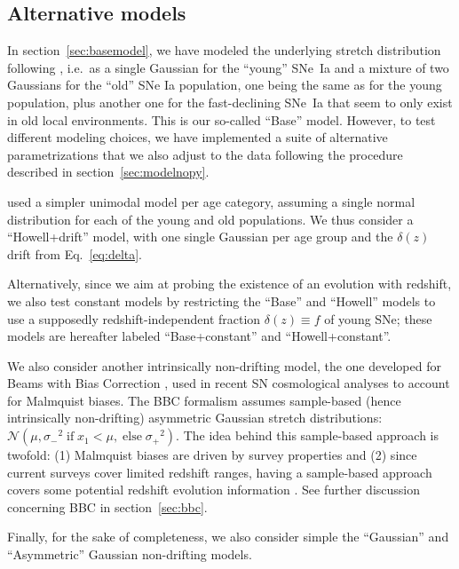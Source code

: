 \documentclass[]{aa} %
\begin{document}
\subsection{Alternative models}\label{sec:othermodel}

In section~\ref{sec:basemodel}, we have modeled the underlying stretch
distribution following \cite{rigault2018}, i.e.\ as a single Gaussian for the
``young'' SNe~Ia and a mixture of two Gaussians for the ``old'' SNe Ia
population, one being the same as for the young population, plus another one for
the fast-declining SNe~Ia that seem to only exist in old local environments.
This is our so-called ``Base'' model. However, to test different modeling
choices, we have implemented a suite of alternative parametrizations that we
also adjust to the data following the procedure described in
section~\ref{sec:modelnopy}. 

\cite{howell2007} used a simpler unimodal model per age category, assuming a
single normal distribution for each of the young and old populations.  We thus
consider a ``Howell+drift'' model, with one single Gaussian per age group and
the $\delta(z)$ drift from Eq.~\ref{eq:delta}.

Alternatively, since we aim at probing the existence of an evolution with
redshift, we also test constant models by restricting the ``Base'' and
``Howell'' models to use a supposedly redshift-independent fraction $\delta(z)
\equiv f$ of young SNe; these models are hereafter labeled ``Base+constant'' and
``Howell+constant''.

We also consider another intrinsically non-drifting model, the one developed for
Beams with Bias Correction \cite[BBC,][]{scolnic2016, kessler2017}, used in
recent SN cosmological analyses \cite[e.g.][]{scolnic2018a, descosmopaper2019,
riess2016, riess2019} to account for Malmquist biases. The BBC formalism assumes
sample-based (hence intrinsically non-drifting) asymmetric Gaussian stretch
distributions: $\mathcal{N}\left(\mu,
\sigma_-{}^2\;\text{if}\;x_1<\mu,\;\text{else}\;\sigma_+{}^2\right)$. The idea
behind this sample-based approach is twofold: (1) Malmquist biases are driven by
survey properties and (2) since current surveys cover limited redshift ranges, having a sample-based approach covers
some potential redshift evolution information \citep{scolnic2016, scolnic2018a}.
See further discussion concerning BBC in section~\ref{sec:bbc}. 

Finally, for the sake of completeness, we also consider simple the ``Gaussian''
and ``Asymmetric'' Gaussian non-drifting models. 
\end{document}
